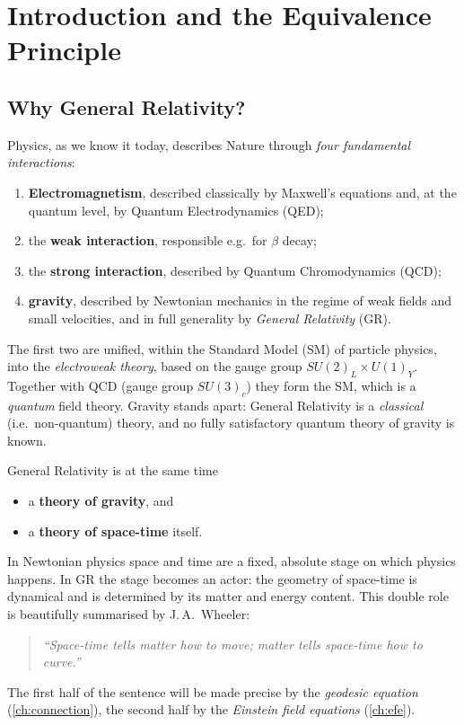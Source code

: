 \chapter{Introduction and the Equivalence Principle}

\section{Why General Relativity?}

Physics, as we know it today, describes Nature through \emph{four fundamental interactions}:
\begin{enumerate}[label=(\roman*)]
  \item \textbf{Electromagnetism}, described classically by Maxwell's equations and, at the quantum level, by Quantum Electrodynamics (QED);
  \item the \textbf{weak interaction}, responsible e.g.\ for $\beta$ decay;
  \item the \textbf{strong interaction}, described by Quantum Chromodynamics (QCD);
  \item \textbf{gravity}, described by Newtonian mechanics in the regime of weak fields and small velocities, and in full generality by \emph{General Relativity} (GR).
\end{enumerate}
The first two are unified, within the Standard Model (SM) of particle physics, into the \emph{electroweak theory},
based on the gauge group $SU(2)_L\times U(1)_Y$. Together with QCD (gauge group $SU(3)_c$) they form the SM,
which is a \emph{quantum} field theory. Gravity stands apart: General Relativity is a \emph{classical} (i.e.\ non-quantum) theory,
and no fully satisfactory quantum theory of gravity is known.

General Relativity is at the same time
\begin{itemize}[nosep]
  \item a \textbf{theory of gravity}, and
  \item a \textbf{theory of space-time} itself.
\end{itemize}
In Newtonian physics space and time are a fixed, absolute stage on which physics happens. In GR the stage becomes an actor:
the geometry of space-time is dynamical and is determined by its matter and energy content. This double role is beautifully summarised by J.\,A.~Wheeler:
\begin{quote}
\emph{``Space-time tells matter how to move; matter tells space-time how to curve.''}
\end{quote}
The first half of the sentence will be made precise by the \emph{geodesic equation} (\cref{ch:connection}), the second half by the \emph{Einstein field equations} (\cref{ch:efe}).

